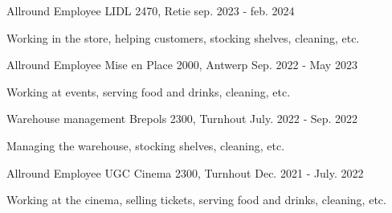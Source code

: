 

\begin{cventries}

  \cventry
    {Allround Employee} %
    {LIDL} %
    {2470, Retie} %
    {sep. 2023 ‑ feb. 2024} %
    {
    \begin{cvitems} %
        \item {Working in the store, helping customers, stocking shelves, cleaning, etc.}
    \end{cvitems}
    }

\cventry
    {Allround Employee} %
    {Mise en Place} %
    {2000, Antwerp} %
    {Sep. 2022 ‑ May 2023} %
    {
        \begin{cvitems} %
            \item {Working at events, serving food and drinks, cleaning, etc.}
        \end{cvitems}
    }

\cventry
    {Warehouse management} %
    {Brepols} %
    {2300, Turnhout} %
    {July. 2022 ‑ Sep. 2022} %
    {
        \begin{cvitems} %
            \item {Managing the warehouse, stocking shelves, cleaning, etc.}
        \end{cvitems}
    }

\cventry
    {Allround Employee} %
    {UGC Cinema} %
    {2300, Turnhout} %
    {Dec. 2021 ‑ July. 2022} %
    {
        \begin{cvitems} %
            \item {Working at the cinema, selling tickets, serving food and drinks, cleaning, etc.}
        \end{cvitems}
    }


\end{cventries}
